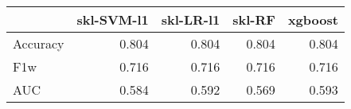 \begin{tabular}{lrrrr}
\toprule
{} &  skl-SVM-l1 &  skl-LR-l1 &  skl-RF &  xgboost \\
\midrule
Accuracy &       0.804 &      0.804 &   0.804 &    0.804 \\
F1w      &       0.716 &      0.716 &   0.716 &    0.716 \\
AUC      &       0.584 &      0.592 &   0.569 &    0.593 \\
\bottomrule
\end{tabular}
